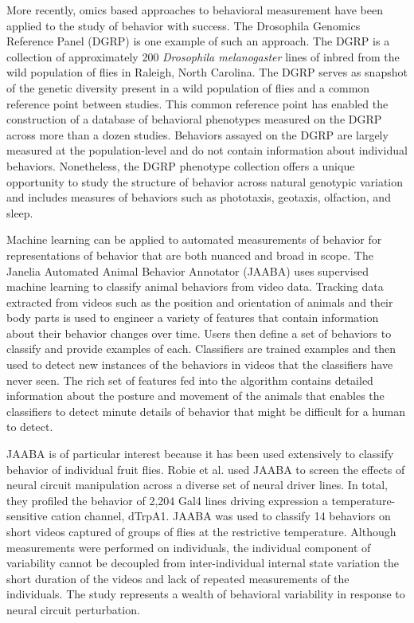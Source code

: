 \documentclass[12pt,letterpaper]{article}
\begin{document}
More recently, omics based approaches to behavioral measurement have been applied to the study of behavior with success. The Drosophila Genomics Reference Panel (DGRP) is one example of such an approach. The DGRP is a collection of approximately 200 \textit{Drosophila melanogaster} lines of inbred from the wild population of flies in Raleigh, North Carolina. The DGRP serves as snapshot of the genetic diversity present in a wild population of flies and a common reference point between studies. This common reference point has enabled the construction of a database of behavioral phenotypes measured on the DGRP across more than a dozen studies. Behaviors assayed on the DGRP are largely measured at the population-level and do not contain information about individual behaviors. Nonetheless, the DGRP phenotype collection offers a unique opportunity to study the structure of behavior across natural genotypic variation and includes measures of behaviors such as phototaxis, geotaxis, olfaction, and sleep.

Machine learning can be applied to automated measurements of behavior for representations of behavior that are both nuanced and broad in scope. The Janelia Automated Animal Behavior Annotator (JAABA) uses supervised machine learning to classify animal behaviors from video data. Tracking data extracted from videos such as the position and orientation of animals and their body parts is used to engineer a variety of features that contain information about their behavior changes over time. Users then define a set of behaviors to classify and provide examples of each. Classifiers are trained examples and then used to detect new instances of the behaviors in videos that the classifiers have never seen. The rich set of features fed into the algorithm contains detailed information about the posture and movement of the animals that enables the classifiers to detect minute details of behavior that might be difficult for a human to detect. 

JAABA is of particular interest because it has been used extensively to classify behavior of individual fruit flies. Robie et al. used JAABA to screen the effects of neural circuit manipulation across a diverse set of neural driver lines. In total, they profiled the behavior of 2,204 Gal4 lines driving expression a temperature-sensitive cation channel, dTrpA1. JAABA was used to classify 14 behaviors on short videos captured of groups of flies at the restrictive temperature. Although measurements were performed on individuals, the individual component of variability cannot be decoupled from inter-individual internal state variation the short duration of the videos and lack of repeated measurements of the individuals. The study represents a wealth of behavioral variability in response to neural circuit perturbation.
\end{document}
